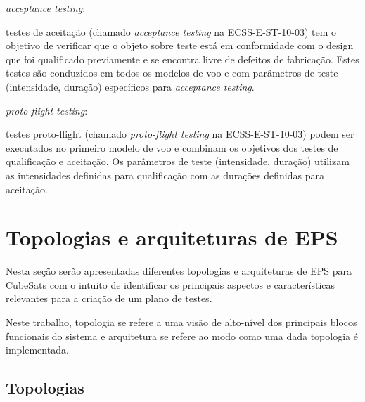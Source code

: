 \begin{alineas}
    \item \textit{acceptance testing}:
    \begin{alineas}
        \item testes de aceitação (chamado \textit{acceptance testing} na ECSS-E-ST-10-03) tem o objetivo de verificar que o objeto sobre teste está em conformidade com o design que foi qualificado previamente e se encontra livre de defeitos de fabricação. Estes testes são conduzidos em todos os modelos de voo e com parâmetros de teste (intensidade, duração) específicos para \textit{acceptance testing}.
    \end{alineas}

    \item \textit{proto-flight testing}:
    \begin{alineas}
        \item testes proto-flight (chamado \textit{proto-flight testing} na ECSS-E-ST-10-03) podem ser executados no primeiro modelo de voo e combinam os objetivos dos testes de qualificação e aceitação. Os parâmetros de teste (intensidade, duração) utilizam as intensidades definidas para qualificação com as durações definidas para aceitação.
    \end{alineas}
\end{alineas}



\section{Topologias e arquiteturas de EPS}\label{sec:arq-top}

Nesta seção serão apresentadas diferentes topologias e arquiteturas de \gls{EPS} para CubeSats com o intuito de identificar os principais aspectos e características relevantes para a criação de um plano de testes.

Neste trabalho, topologia se refere a uma visão de alto-nível dos principais blocos funcionais do sistema e arquitetura se refere ao modo como uma dada topologia é implementada.

\subsection{Topologias}\label{sec:topologias}

